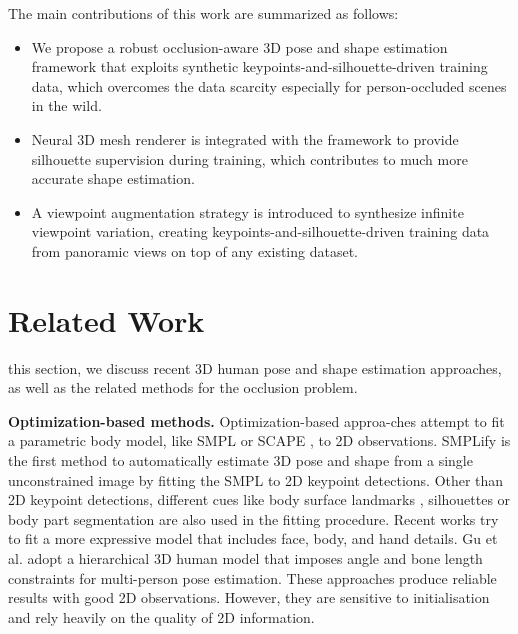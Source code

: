 \documentclass[journal]{IEEEtran}
\begin{document}
The main contributions of this work are summarized as follows:
\begin{itemize}
    \item We propose a robust occlusion-aware 3D pose and shape estimation framework that exploits synthetic keypoints-and-silhouette-driven training data, which overcomes the data scarcity especially for person-occluded scenes in the wild.

    \item Neural 3D mesh renderer is integrated with the framework to provide silhouette supervision during training, which contributes to much more accurate shape estimation.

    \item A viewpoint augmentation strategy is introduced to synthesize infinite viewpoint variation, creating keypoints-and-silhouette-driven training data from panoramic views on top of any existing dataset.

\end{itemize}

\section{Related Work}
 this section, we discuss recent 3D human pose and shape estimation approaches, as well as the related methods for the occlusion problem.

\noindent\textbf{Optimization-based methods.} Optimization-based approa-ches attempt to fit a parametric body model, like SMPL \cite{SMPL:2015} or SCAPE \cite{anguelov2005scape}, to 2D observations. SMPLify \cite{Bogo:ECCV:2016} is the first method to automatically estimate 3D pose and shape from a single unconstrained image by fitting the SMPL to 2D keypoint detections. Other than 2D keypoint detections, different cues like body surface landmarks \cite{lassner2017unite}, silhouettes \cite{lassner2017unite} or body part segmentation \cite{zanfir2018monocular} are also used in the fitting procedure. Recent works try to fit a more expressive model \cite{joo2018total,xiang2019monocular} that includes face, body, and hand details. Gu et al. \cite{gu2019multi} adopt a hierarchical 3D human model that imposes angle and bone length constraints for multi-person pose estimation. These approaches produce reliable results with good 2D observations. However, they are sensitive to initialisation and rely heavily on the quality of 2D information.
\end{document}
